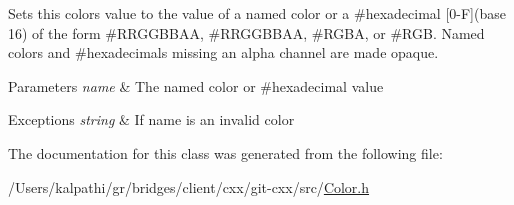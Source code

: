 Sets this color\textquotesingle{}s value to the value of a named color or a \#hexadecimal \mbox{[}0-\/F\mbox{]}(base 16) of the form \#\+R\+R\+G\+G\+B\+B\+AA, \#\+R\+R\+G\+G\+B\+B\+AA, \#\+R\+G\+BA, or \#\+R\+GB. Named colors and \#hexadecimals missing an alpha channel are made opaque.


\begin{DoxyParams}{Parameters}
{\em name} & The named color or \#hexadecimal value \\
\hline
\end{DoxyParams}

\begin{DoxyExceptions}{Exceptions}
{\em string} & If name is an invalid color \\
\hline
\end{DoxyExceptions}


The documentation for this class was generated from the following file\+:\begin{DoxyCompactItemize}
\item 
/\+Users/kalpathi/gr/bridges/client/cxx/git-\/cxx/src/\hyperlink{_color_8h}{Color.\+h}\end{DoxyCompactItemize}
